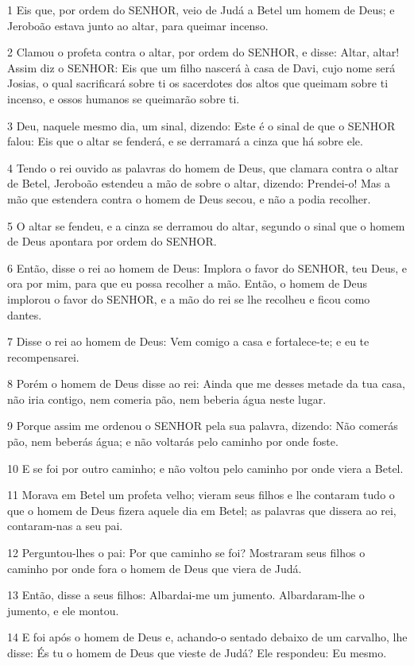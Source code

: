 \par 1 Eis que, por ordem do SENHOR, veio de Judá a Betel um homem de Deus; e Jeroboão estava junto ao altar, para queimar incenso.
\par 2 Clamou o profeta contra o altar, por ordem do SENHOR, e disse: Altar, altar! Assim diz o SENHOR: Eis que um filho nascerá à casa de Davi, cujo nome será Josias, o qual sacrificará sobre ti os sacerdotes dos altos que queimam sobre ti incenso, e ossos humanos se queimarão sobre ti.
\par 3 Deu, naquele mesmo dia, um sinal, dizendo: Este é o sinal de que o SENHOR falou: Eis que o altar se fenderá, e se derramará a cinza que há sobre ele.
\par 4 Tendo o rei ouvido as palavras do homem de Deus, que clamara contra o altar de Betel, Jeroboão estendeu a mão de sobre o altar, dizendo: Prendei-o! Mas a mão que estendera contra o homem de Deus secou, e não a podia recolher.
\par 5 O altar se fendeu, e a cinza se derramou do altar, segundo o sinal que o homem de Deus apontara por ordem do SENHOR.
\par 6 Então, disse o rei ao homem de Deus: Implora o favor do SENHOR, teu Deus, e ora por mim, para que eu possa recolher a mão. Então, o homem de Deus implorou o favor do SENHOR, e a mão do rei se lhe recolheu e ficou como dantes.
\par 7 Disse o rei ao homem de Deus: Vem comigo a casa e fortalece-te; e eu te recompensarei.
\par 8 Porém o homem de Deus disse ao rei: Ainda que me desses metade da tua casa, não iria contigo, nem comeria pão, nem beberia água neste lugar.
\par 9 Porque assim me ordenou o SENHOR pela sua palavra, dizendo: Não comerás pão, nem beberás água; e não voltarás pelo caminho por onde foste.
\par 10 E se foi por outro caminho; e não voltou pelo caminho por onde viera a Betel.
\par 11 Morava em Betel um profeta velho; vieram seus filhos e lhe contaram tudo o que o homem de Deus fizera aquele dia em Betel; as palavras que dissera ao rei, contaram-nas a seu pai.
\par 12 Perguntou-lhes o pai: Por que caminho se foi? Mostraram seus filhos o caminho por onde fora o homem de Deus que viera de Judá.
\par 13 Então, disse a seus filhos: Albardai-me um jumento. Albardaram-lhe o jumento, e ele montou.
\par 14 E foi após o homem de Deus e, achando-o sentado debaixo de um carvalho, lhe disse: És tu o homem de Deus que vieste de Judá? Ele respondeu: Eu mesmo.

